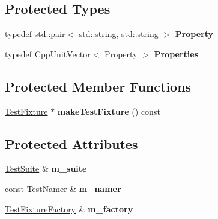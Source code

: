 \subsection*{Protected Types}
\begin{DoxyCompactItemize}
\item 
typedef std\+::pair$<$ std\+::string, std\+::string $>$ {\bfseries Property}\hypertarget{class_test_suite_builder_context_base_a1e2319a53ecd7a718c87f4ea5c42d4c6}{}\label{class_test_suite_builder_context_base_a1e2319a53ecd7a718c87f4ea5c42d4c6}

\item 
typedef Cpp\+Unit\+Vector$<$ Property $>$ {\bfseries Properties}\hypertarget{class_test_suite_builder_context_base_a95565394a60a8b8d843a5a64d2572a86}{}\label{class_test_suite_builder_context_base_a95565394a60a8b8d843a5a64d2572a86}

\end{DoxyCompactItemize}
\subsection*{Protected Member Functions}
\begin{DoxyCompactItemize}
\item 
\hyperlink{class_test_fixture}{Test\+Fixture} $\ast$ {\bfseries make\+Test\+Fixture} () const \hypertarget{class_test_suite_builder_context_base_a5474060095c1ab76f16a133af0fb3b52}{}\label{class_test_suite_builder_context_base_a5474060095c1ab76f16a133af0fb3b52}

\end{DoxyCompactItemize}
\subsection*{Protected Attributes}
\begin{DoxyCompactItemize}
\item 
\hyperlink{class_test_suite}{Test\+Suite} \& {\bfseries m\+\_\+suite}\hypertarget{class_test_suite_builder_context_base_a16ea2e4d82cd9f94b843839dc8ed2931}{}\label{class_test_suite_builder_context_base_a16ea2e4d82cd9f94b843839dc8ed2931}

\item 
const \hyperlink{class_test_namer}{Test\+Namer} \& {\bfseries m\+\_\+namer}\hypertarget{class_test_suite_builder_context_base_abdbbb982c6c41ae8ecc5abe954c56e70}{}\label{class_test_suite_builder_context_base_abdbbb982c6c41ae8ecc5abe954c56e70}

\item 
\hyperlink{class_test_fixture_factory}{Test\+Fixture\+Factory} \& {\bfseries m\+\_\+factory}\hypertarget{class_test_suite_builder_context_base_ad814ae6df45822300bf99dfcee0277f7}{}\label{class_test_suite_builder_context_base_ad814ae6df45822300bf99dfcee0277f7}

\end{DoxyCompactItemize}



